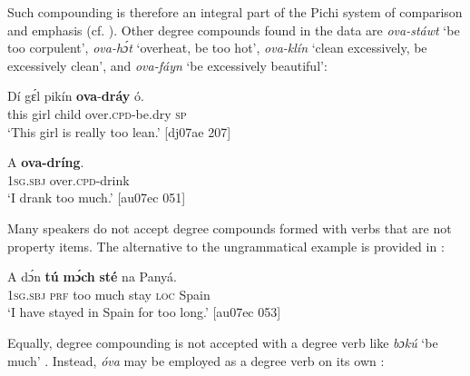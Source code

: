 Such compounding is therefore an integral part of the Pichi system of comparison and emphasis (cf. ). Other degree compounds found in the data are \textit{ova-stáwt} ‘be too corpulent’, \textit{ova-hɔ́t} ‘overheat, be too hot’, \textit{ova-klín} ‘clean excessively, be excessively clean’, and \textit{ova-fáyn} ‘be excessively beautiful’:



\ea%
    \label{ex:key:127}
    \gll Dí  gɛ́l  pikín  \textbf{ova}-\textbf{dráy}    ó.\\
this  girl  child  over.\textsc{cpd}{}-be.dry  \textsc{sp}\\

\glt ‘This girl is really too lean.’ [dj07ae 207]
\z


\ea%
    \label{ex:key:128}
    \gll \MakeUppercase{A}   \textbf{ova-dríng}.\\
\textsc{1sg.sbj}  over.\textsc{cpd}{}-drink\\

\glt ‘I drank too much.’ [au07ec 051]
\z

Many speakers do not accept degree compounds formed with verbs that are not property items. The alternative to the ungrammatical example  is provided in : 

\z


\ea%
    \label{ex:key:130}
    \gll \MakeUppercase{A}   dɔ́n  \textbf{tú}  \textbf{mɔ́ch}  \textbf{sté}    na  Panyá.\\
\textsc{1sg.sbj}  \textsc{prf}  too  much  stay    \textsc{loc}  Spain\\

\glt ‘I have stayed in Spain for too long.’ [au07ec 053]
\z

Equally, degree compounding is not accepted with a degree verb like \textit{bɔkú} ‘be much’ . Instead, \textit{óva} may be employed as a degree verb on its own :


\z


